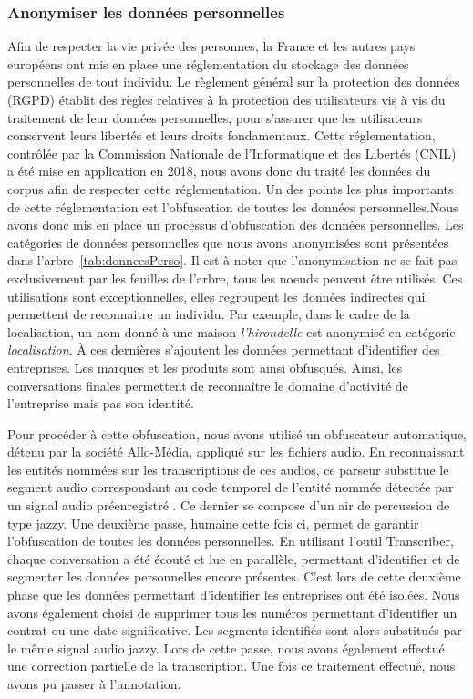 \subsubsection{Anonymiser les données personnelles}
Afin de respecter la vie privée des personnes, la France et les autres pays européens ont mis en place une réglementation du stockage des données personnelles de tout individu. Le règlement général sur la protection des données (RGPD) établit des règles relatives à la protection des utilisateurs vis à vis du traitement de leur données personnelles, pour s'assurer que les utilisateurs conservent leurs libertés et leurs droits fondamentaux. Cette réglementation, contrôlée par la Commission Nationale de l'Informatique et des Libertés (CNIL) a été mise en application en 2018, nous avons donc du traité les données du corpus afin de respecter cette réglementation.
Un des points les plus importants de cette réglementation est l'obfuscation de toutes les données personnelles.Nous avons donc mis en place un processus d'obfuscation des données personnelles. Les catégories de données personnelles que nous avons anonymisées sont présentées dans l'arbre~\ref{tab:donneesPerso}. Il est à noter que l'anonymisation ne se fait pas exclusivement par les feuilles de l'arbre, tous les noeuds peuvent être utilisés. Ces utilisations sont exceptionnelles, elles regroupent les données indirectes qui permettent de reconnaitre un individu. Par exemple, dans le cadre de la localisation, un nom donné à une maison \textit{l'hirondelle} est anonymisé en catégorie \textit{localisation}. À ces dernières s'ajoutent les données permettant d'identifier des entreprises. Les marques et les produits sont ainsi obfusqués. Ainsi, les conversations finales permettent de reconnaître le domaine d'activité de l'entreprise mais pas son identité.


Pour procéder à cette obfuscation, nous avons utilisé un obfuscateur automatique, détenu par la société Allo-Média, appliqué sur les fichiers audio. En reconnaissant les entités nommées sur les transcriptions de ces audios, ce parseur substitue le segment audio correspondant au code temporel de l’entité nommée détectée par un signal audio préenregistré . Ce dernier se compose d'un air de percussion de type jazzy.
Une deuxième passe, humaine cette fois ci, permet de garantir l'obfuscation de toutes les données personnelles. En utilisant l'outil Transcriber, chaque conversation a été écouté et lue en parallèle, permettant d'identifier et de segmenter les données personnelles encore présentes. C'est lors de cette deuxième phase que les données permettant d'identifier les entreprises ont été isolées. Nous avons également choisi de supprimer tous les numéros permettant d'identifier un contrat ou une date significative. Les segments identifiés sont alors substitués par le même signal audio jazzy. Lors de cette passe, nous avons également effectué une correction partielle de la transcription. Une fois ce traitement effectué, nous avons pu passer à l'annotation.

